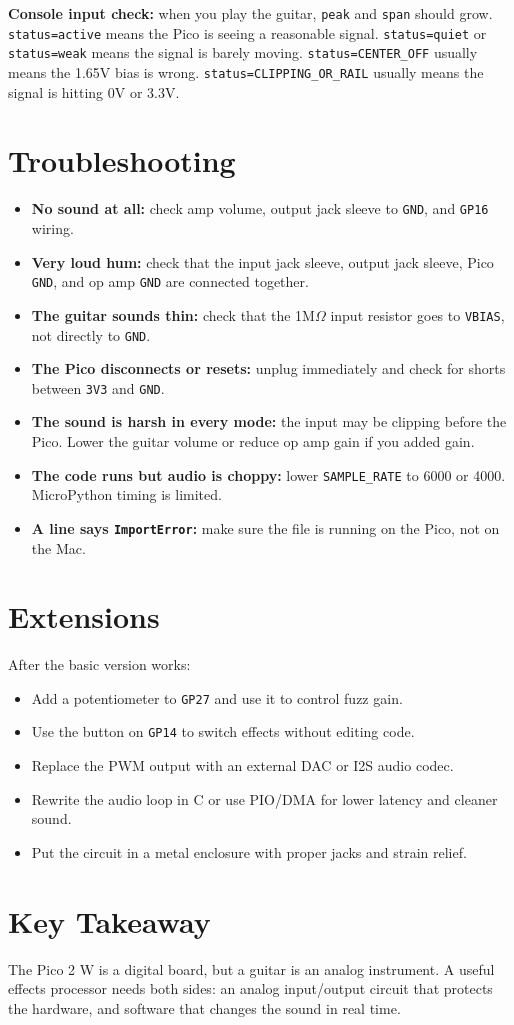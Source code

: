 \documentclass[11pt,letterpaper]{article}
\newcommand{\pin}[1]{\texttt{#1}}
\begin{document}
\textbf{Console input check:} when you play the guitar, \texttt{peak} and \texttt{span} should grow. \texttt{status=active} means the Pico is seeing a reasonable signal. \texttt{status=quiet} or \texttt{status=weak} means the signal is barely moving. \texttt{status=CENTER\_OFF} usually means the 1.65V bias is wrong. \texttt{status=CLIPPING\_OR\_RAIL} usually means the signal is hitting 0V or 3.3V.

\section*{Troubleshooting}
\begin{itemize}
    \item \textbf{No sound at all:} check amp volume, output jack sleeve to \texttt{GND}, and \pin{GP16} wiring.
    \item \textbf{Very loud hum:} check that the input jack sleeve, output jack sleeve, Pico \texttt{GND}, and op amp \texttt{GND} are connected together.
    \item \textbf{The guitar sounds thin:} check that the 1M$\Omega$ input resistor goes to \texttt{VBIAS}, not directly to \texttt{GND}.
    \item \textbf{The Pico disconnects or resets:} unplug immediately and check for shorts between \texttt{3V3} and \texttt{GND}.
    \item \textbf{The sound is harsh in every mode:} the input may be clipping before the Pico. Lower the guitar volume or reduce op amp gain if you added gain.
    \item \textbf{The code runs but audio is choppy:} lower \texttt{SAMPLE\_RATE} to 6000 or 4000. MicroPython timing is limited.
    \item \textbf{A line says \texttt{ImportError}:} make sure the file is running on the Pico, not on the Mac.
\end{itemize}

\section*{Extensions}
After the basic version works:

\begin{itemize}
    \item Add a potentiometer to \pin{GP27} and use it to control fuzz gain.
    \item Use the button on \pin{GP14} to switch effects without editing code.
    \item Replace the PWM output with an external DAC or I2S audio codec.
    \item Rewrite the audio loop in C or use PIO/DMA for lower latency and cleaner sound.
    \item Put the circuit in a metal enclosure with proper jacks and strain relief.
\end{itemize}

\section*{Key Takeaway}
The Pico 2 W is a digital board, but a guitar is an analog instrument. A useful effects processor needs both sides: an analog input/output circuit that protects the hardware, and software that changes the sound in real time.
\end{document}
